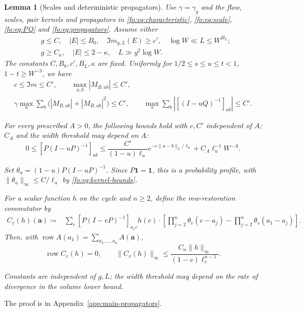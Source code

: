 \documentclass[11pt]{article}
\numberwithin{equation}{section}
\newtheorem{lemma}[theorem]{Lemma}
\theoremstyle{remark}
\begin{document}
\begin{lemma}[Scales and deterministic propagators]\label{da:lem:scales-propagators}
Use $\gamma=\gamma_g$ and the flow, scales, pair kernels and propagators
in \eqref{fo:eq:characteristic}, \eqref{fo:eq:scale}, \eqref{fo:eq:PQ}
and \eqref{fo:eq:propagators}. Assume either
\begin{equation}\label{da:eq:propagation-domain}
 \begin{aligned}
 &g\le C,\quad |E|\le B_0,\quad \Im m_{g,L}(E)\ge c',\quad
       \log W\ll L\le W^{B_L};\\
 &g\ge C_\kappa,\quad |E|\le2-\kappa,\quad L\gg g^2\log W.
 \end{aligned}
\end{equation}
The constants $C,B_0,c',B_L,\kappa$ are fixed.
Uniformly for $1/2\le s\le u\le t<1$, $1-t\ge W^{-3}$, we have
\begin{equation}\label{fo:eq:propagation-dyson}
 \begin{gathered}
 c\le\Im m\le C',\qquad \max_{a,b}|M_{B,ab}|\le C',\\
 \gamma\max_a\sum_b\bigl(|M_{B,ab}|+|M_{B,ab}|^2\bigr)\le C',
 \qquad \max_a\sum_b|[(I-uQ)^{-1}]_{ab}|\le C'.
 \end{gathered}
\end{equation}

For every prescribed $A>0$, the following bounds hold with $c,C'$
independent of $A$; $C_A$ and the width threshold may depend on $A$:
\begin{equation}\label{fo:eq:kernel-bounds}
 0\le[P(I-uP)^{-1}]_{ab}
 \le\frac {C'}{(1-u)\ell_u}e^{-c\|a-b\|_L/\ell_u}+C_A\ell_u^{-1}W^{-A}.
\end{equation}

Set $\theta_u=(1-u)P(I-uP)^{-1}$. Since $P\mathbf1=\mathbf1$,
this is a probability profile, with $\|\theta_u\|_\infty\le C/\ell_u$
by \eqref{fo:eq:kernel-bounds}.

For a scalar function $h$ on the cycle and $n\ge2$, define the
row-restoration commutator by
\begin{equation}\label{gc:eq:commutator}
 \begin{split}
 C_v(h)(\boldsymbol a)\coloneqq {}&\sum_c[P(I-vP)^{-1}]_{a_1c}h(c) \cdot\left[\prod_{j=2}^n\theta_v(c-a_j)
             -\prod_{j=2}^n\theta_v(a_1-a_j)\right].
 \end{split}
\end{equation}
Then, with $\operatorname{row}A(a_1)=\sum_{a_2,\ldots,a_n}A(\boldsymbol a)$,
\begin{equation}\label{da:eq:commutator-bound}
 \operatorname{row}C_v(h)=0,\qquad
 \|C_v(h)\|_\infty\le\frac{C_n\|h\|_\infty}{(1-v)\ell_v^{n-1}}.
\end{equation}

Constants are independent of $g,L$; the width threshold may depend on
the rate of divergence in the volume lower bound.
\end{lemma}
The proof is in Appendix~\ref{app:main-propagators}.
\end{document}
